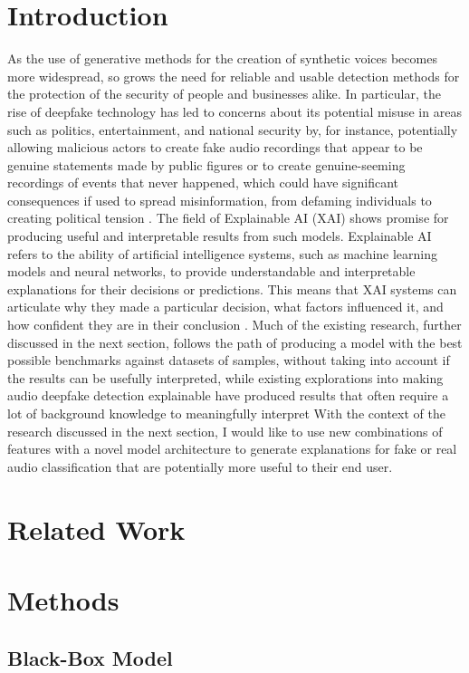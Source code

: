 \documentclass{article}
\begin{document}
    \section{Introduction}
    As the use of generative methods for the creation of synthetic voices becomes more widespread,
    so grows the need for reliable and usable detection methods for the protection of the security
    of people and businesses alike. In particular, the rise of deepfake technology has led to
	concerns about its potential misuse in areas such as politics, entertainment, and national
	security by, for instance, potentially allowing malicious actors to create fake audio
	recordings that appear to be genuine statements made by public figures or to create
	genuine-seeming recordings of events that never happened, which could have significant
	consequences if used to spread misinformation, from defaming individuals to creating political
	tension \cite{veerasamy_rising_2022,albahar_deepfakes_2005}. The field of Explainable AI (XAI)
	shows promise for producing useful and interpretable results from such models. Explainable AI
	refers to the ability of artificial intelligence systems, such as machine learning models and
	neural networks, to provide understandable and interpretable explanations for their decisions
	or predictions. This means that XAI systems can articulate why they made a particular
	decision, what factors influenced it, and how confident they are in their conclusion
	\cite{hind_explaining_2019}. Much of the existing research, further discussed in the next
	section, follows the path of producing a model with the best possible benchmarks against
	datasets of samples, without taking into account if the results can be usefully interpreted,
	while existing explorations into making audio deepfake detection explainable have produced
	results that often require a lot of background knowledge to meaningfully interpret With the
	context of the research discussed in the next section, I would like to use new combinations of
	features with a novel model architecture to generate explanations for fake or real audio
	classification that are potentially more useful to their end user.
	\section{Related Work}
	\section{Methods}
		\subsection{Black-Box Model}
\end{document}
